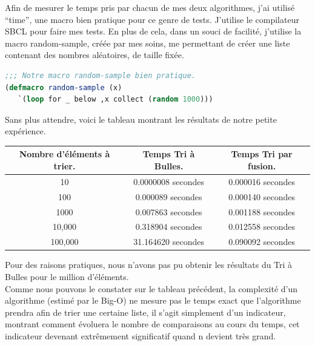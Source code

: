 \documentclass[a4paper, 12pt]{article}
\numberwithin{equation}{subsection}
\begin{document}
Afin de mesurer le temps pris par chacun de mes deux algorithmes, j'ai utilisé ``time'', une macro bien pratique pour ce genre de tests. J'utilise le compilateur SBCL pour faire mes tests. En plus de cela, dans un souci de facilité, j'utilise la macro random-sample, créée par mes soins, me permettant de créer une liste contenant des nombres aléatoires, de taille fixée. \\

\begin{lstlisting}[language=Lisp]
;;; Notre macro random-sample bien pratique.
(defmacro random-sample (x)
   `(loop for _ below ,x collect (random 1000)))
\end{lstlisting}
Sans plus attendre, voici le tableau montrant les résultats de notre petite expérience.
\begin{table}[H]
  \begin{tabular}{|c|c|c|}
    \hline {\bf Nombre d'éléments à trier.} & {\bf Temps Tri à Bulles.} & {\bf Temps Tri par fusion.} \\
    \hline 10 & 0.0000008 secondes & 0.000016 secondes \\
    100 & 0.000089 secondes & 0.000140 secondes \\
    1000 & 0.007863 secondes & 0.001188 secondes \\
    10,000 & 0.318904 secondes & 0.012558 secondes \\
    100,000 & 31.164620 secondes & 0.090092 secondes \\
    \hline
  \end{tabular}
\end{table} \smallskip
Pour des raisons pratiques, nous n'avons pas pu obtenir les résultats du Tri à Bulles pour le million d'éléments. \\

Comme nous pouvons le constater sur le tableau précédent, la complexité d'un algorithme (estimé par le Big-O) ne mesure pas le temps exact que l'algorithme prendra afin de trier une certaine liste, il s'agit simplement d'un indicateur, montrant comment évoluera le nombre de comparaisons au cours du temps, cet indicateur devenant extrêmement significatif quand n devient très grand. \\
\end{document}
